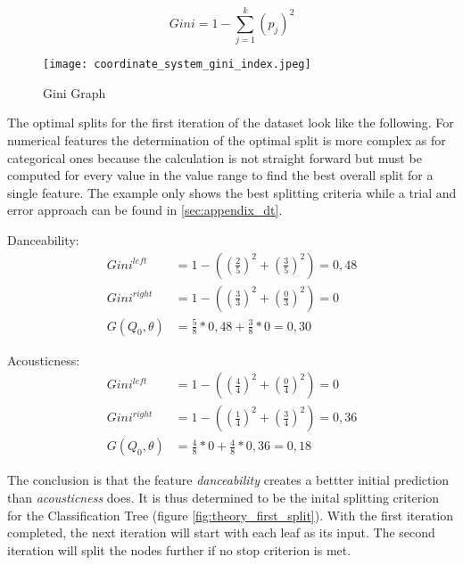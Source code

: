 \begin{equation}
    Gini = 1 - \sum ^k_{j = 1}(p_{j})^2
    \label{equ:dt_gini}
\end{equation}

\begin{figure}[H]
    \centering
    \caption[]{Gini Graph}
	\label{fig:coordinate_system_initial_dataset}
    \texttt{[image: coordinate\_system\_gini\_index.jpeg]}
\end{figure}

The optimal splits for the first iteration of the dataset look like the following. For numerical features the determination of 
the optimal split is more complex as for categorical ones because the calculation is not straight forward but must be computed
for every value in the value range to find the best overall split for a single feature. The example only shows the best splitting
criteria while a trial and error approach can be found in \ref{sec:appendix_dt}. 

Danceability: 
\begin{equation*}
    \begin{aligned}
        Gini^{left} &= 1 - ((\frac{2}{5})^2 + (\frac{3}{5})^2) = 0,48 
        \\
        Gini^{right}  &= 1 - ((\frac{3}{3})^2 + (\frac{0}{3})^2) = 0 
        \\
        G(Q_{0},\theta) &= \frac{5}{8} * 0,48 + \frac{3}{8} * 0 = 0,30
    \end{aligned}
\end{equation*}

Acousticness: 
\begin{equation*}
    \begin{aligned}
        Gini^{left}  &= 1 - ((\frac{4}{4})^2 + (\frac{0}{4})^2) = 0
        \\
        Gini^{right} &= 1 - ((\frac{1}{4})^2 + (\frac{3}{4})^2) = 0,36
        \\
        G(Q_{0},\theta) &= \frac{4}{8} * 0 + \frac{4}{8} * 0,36 = 0,18
    \end{aligned}
\end{equation*}

The conclusion is that the feature \emph{danceability} creates a bettter initial prediction than \emph{acousticness} does. It is thus 
determined to be the inital splitting criterion for the Classification Tree (figure \ref{fig:theory_first_split}). With the first iteration completed, the next iteration
will start with each leaf as its input. The second iteration will split the nodes further if no stop criterion is met. 

